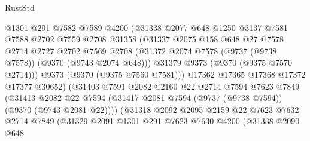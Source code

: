 \begin{lexlean}{RustStd}
\begin{coremodule}
{\begin{coremodule}
{{{{{{{{{{{{{{{{{{{{{{{{{{{{{{{{{{{{{{{                          @1301
                          @291
                          @7582
                          @7589
                          @4200
                          (@31338
                            @2077
                            @648
                            @1250
                            @3137
                            @7581
                            @7588
                            @2702
                            @7559
                            @2708
                            @31358
                            (@31337
                              @2075
                              @158
                              @648
                              @27
                              @7578
                              @2714
                              @2727
                              @2702
                              @7569
                              @2708
                              (@31372 @2074 @7578 (@9737 (@9738 @7578)) (@9370 (@9743 @2074 @648)))
                              @31379
                              @9373
                              (@9370 (@9375 @7570 @2714)))
                            @9373
                            (@9370 (@9375 @7560 @7581)))
                          @17362
                          @17365
                          @17368
                          @17372
                          @17377
                          @30652)
                        (@31403
                          @7591
                          @2082
                          @2160
                          @22
                          @2714
                          @7594
                          @7623
                          @7849
                          (@31413
                            @2082
                            @22
                            @7594
                            (@31417 @2081 @7594 (@9737 (@9738 @7594)) (@9370 (@9743 @2081 @22))))
                          (@31318
                            @2092
                            @2095
                            @2159
                            @22
                            @7623
                            @7632
                            @2714
                            @7849
                            (@31329
                              @2091
                              @1301
                              @291
                              @7623
                              @7630
                              @4200
                              (@31338
                                @2090
                                @648
}}}}}}}}}}}}}}}}}}}}}}}}}}}}}}}}}}}}}}}
\end{coremodule}}
\end{coremodule}
\end{lexlean}
